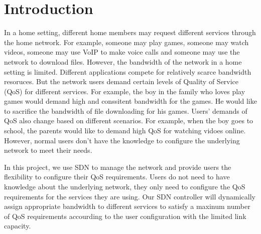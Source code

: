 \section{Introduction}
In a home setting, different home members may request different services through the home network. For example, someone may play games, someone may watch videos, someone may use VoIP to make voice calls and someone may use the network to download files.   
However, the bandwidth of the network in a home setting is limited. Different applications compete for relatively scarce bandwidth resoruces. But the network users demand certain levels of Quality of Service (QoS) for different services. For example, the boy in the family who loves play games would demand high and conssitent bandwidth for the games. He would like to sacrifice the bandwidth of file downloading for his games. 
Users' demands of QoS also change based on different scenarios. For example, when the boy goes to school, the parents would like to demand high QoS for watching vidoes online. However, normal users don't have the knowledge to configure the underlying network to meet their needs.

In this project, we use SDN to manage the network and provide users the flexibility to configure their QoS requirements. Users do not need to have knowledge about the underlying network, they only need to configure the QoS requirements for the services they are using. Our SDN controller will dynamically assign appropriate bandwidth to different services to satisfy a maxinum number of QoS requirements accourding to the user configuration with the limited link capacity. 

\cite{Zhu2014SOCC}
